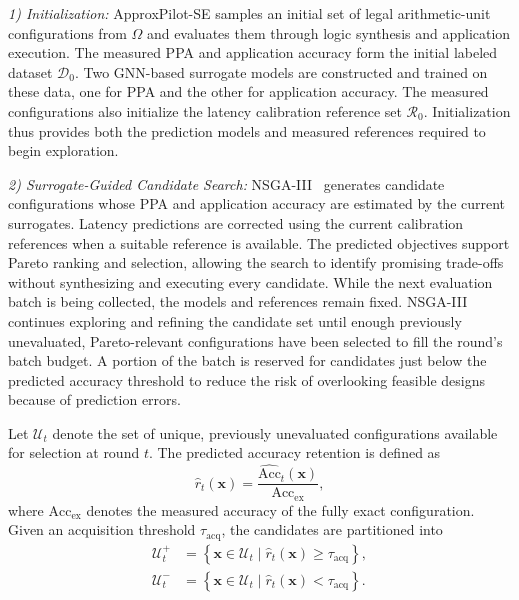 \noindent\textit{1) Initialization:}
ApproxPilot-SE samples an initial set of legal arithmetic-unit configurations from $\Omega$ and evaluates them through logic synthesis and application execution. The measured PPA and application accuracy form the initial labeled dataset $\mathcal{D}_0$. Two GNN-based surrogate models are constructed and trained on these data, one for PPA and the other for application accuracy. The measured configurations also initialize the latency calibration reference set $\mathcal{R}_0$. Initialization thus provides both the prediction models and measured references required to begin exploration.

\noindent\textit{2) Surrogate-Guided Candidate Search:}
NSGA-III~\cite{deb2014nsgaiii} generates candidate configurations whose PPA and application accuracy are estimated by the current surrogates. Latency predictions are corrected using the current calibration references when a suitable reference is available. The predicted objectives support Pareto ranking and selection, allowing the search to identify promising trade-offs without synthesizing and executing every candidate. While the next evaluation batch is being collected, the models and references remain fixed. NSGA-III continues exploring and refining the candidate set until enough previously unevaluated, Pareto-relevant configurations have been selected to fill the round's batch budget. A portion of the batch is reserved for candidates just below the predicted accuracy threshold to reduce the risk of overlooking feasible designs because of prediction errors.

Let $\mathcal{U}_t$ denote the set of unique, previously unevaluated configurations available for selection at round $t$. The predicted accuracy retention is defined as
\begin{equation}
    \widehat r_t(\mathbf{x})
    =
    \frac{\widehat{\mathrm{Acc}}_t(\mathbf{x})}
    {\mathrm{Acc}_{\mathrm{ex}}},
    \label{eq:se_predicted_retention}
\end{equation}
where $\mathrm{Acc}_{\mathrm{ex}}$ denotes the measured accuracy of the fully exact configuration. Given an acquisition threshold $\tau_{\mathrm{acq}}$, the candidates are partitioned into
\begin{equation}
\begin{aligned}
    \mathcal{U}_t^{+}
    &=
    \left\{
    \mathbf{x}\in\mathcal{U}_t
    \mid \widehat r_t(\mathbf{x})
    \ge\tau_{\mathrm{acq}}
    \right\},\\
    \mathcal{U}_t^{-}
    &=
    \left\{
    \mathbf{x}\in\mathcal{U}_t
    \mid \widehat r_t(\mathbf{x})
    <\tau_{\mathrm{acq}}
    \right\}.
\end{aligned}
\label{eq:se_feedback_partition}
\end{equation}

